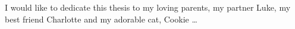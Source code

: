 
\begin{dedication} 

I would like to dedicate this thesis to my loving parents, my partner Luke, my best friend Charlotte and my adorable cat, Cookie \dots

\end{dedication}